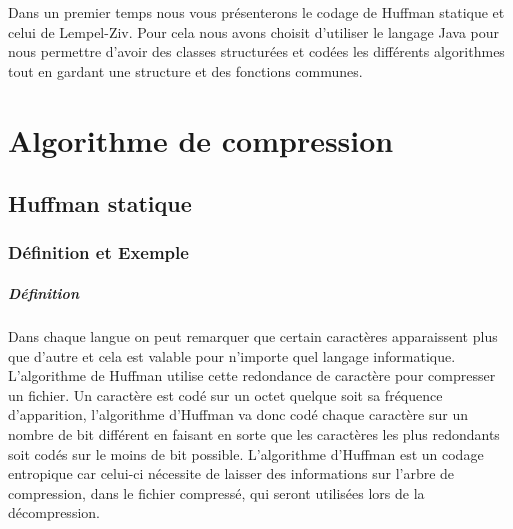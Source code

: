 \documentclass{report}
\begin{document}
Dans un premier temps nous vous présenterons le codage de Huffman statique et celui de Lempel-Ziv. 
Pour cela nous avons choisit d'utiliser le langage Java pour nous permettre d'avoir des classes structurées et codées les différents algorithmes tout en gardant une structure et des fonctions communes.
 \part*{Algorithme de compression}
\chapter*{Huffman statique}
\section*{Définition et Exemple }
\subsubsection*{Définition}
Dans chaque langue on peut remarquer que certain caractères apparaissent plus que d'autre et cela est valable pour n'importe quel langage informatique. L'algorithme de Huffman utilise cette redondance de caractère pour compresser un fichier.  Un caractère est codé sur un octet quelque soit sa fréquence d'apparition, l'algorithme d'Huffman va donc codé chaque caractère sur un nombre de bit différent en faisant en sorte que les caractères les plus redondants soit codés sur le moins de bit possible. L'algorithme d'Huffman est un codage entropique car celui-ci nécessite de laisser des informations sur l'arbre de compression, dans le fichier compressé, qui seront utilisées lors de la décompression.
\end{document}
